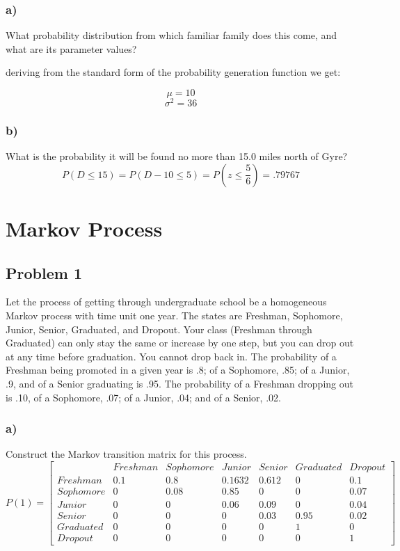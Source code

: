 \documentclass{article}
\begin{document}
\subsubsection*{a)}
What probability distribution from which familiar family does this come, and what are its parameter values?
\begin{center}
    deriving from the standard form of the probability generation function we get:
\end{center}
\begin{equation}
    \mu = \boxed{10}
\end{equation}
\begin{equation}
    \sigma^2 = \boxed{36}
\end{equation}
\subsubsection*{b)}
What is the probability it will be found no more than 15.0 miles north of Gyre?
\begin{equation}
    P(D \leq 15) = P(D-10 \leq 5) = P(z \leq \frac{5}{6}) = \boxed{.79767}
\end{equation}
\newpage
\section*{Markov Process}
\subsection*{Problem 1}
Let the process of getting through undergraduate school be a homogeneous Markov process with time unit one year. The states are Freshman, Sophomore, Junior, Senior, Graduated, and Dropout. Your class (Freshman through Graduated) can only stay the same or increase by one step, but you can drop out at any time before graduation. You cannot drop back in. The probability of a Freshman being promoted in a given year is .8; of a Sophomore, .85; of a Junior, .9, and of a Senior graduating is .95. The probability of a Freshman dropping out is .10, of a Sophomore, .07; of a Junior, .04; and of a Senior, .02.
\subsubsection*{a)}
Construct the Markov transition matrix for this process.
\begin{equation}
    P(1) = 
    \begin{bmatrix}
     & Freshman & Sophomore & Junior & Senior & Graduated & Dropout\\
    Freshman & 0.1 & 0.8 & 0.1632 & 0.612 & 0 & 0.1\\
    Sophomore & 0 & 0.08 & 0.85 & 0 & 0 & 0.07\\
    Junior & 0 & 0 & 0.06 & 0.09 & 0 & 0.04\\
    Senior & 0 & 0 & 0 & 0.03 & 0.95 & 0.02\\
    Graduated & 0 & 0 & 0 & 0 & 1 & 0\\
    Dropout & 0 & 0 & 0 & 0 & 0 & 1
    \end{bmatrix}
\end{equation}
\end{document}
